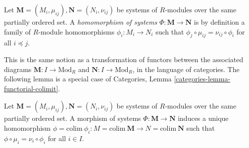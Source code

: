 \begin{definition}
\label{definition-homomorphism-directed-systems}
Let $\textbf{M} = (M_i, \mu_{ij}), \textbf{N} = (N_i, \nu_{ij})$ be
systems of $R$-modules over the same partially ordered set.
A {\it homomorphism of systems} $\Phi : \textbf{M}\rightarrow \textbf{N}$
is by definition a family of $R$-module homomorphisms
$\phi_i : M_i\rightarrow N_{i}$
such that $\phi_j \circ \mu_{ij} = \nu_{ij} \circ \phi_i$
for all $i \preceq j$.
\end{definition}

\noindent
This is the same notion as a transformation of functors
between the associated diagrams $\textbf{M} : I \to \text{Mod}_R$
and $\textbf{N} : I \to \text{Mod}_R$, in the language of
categories.
The following lemma is a special case of
Categories, Lemma \ref{categories-lemma-functorial-colimit}.

\begin{lemma}
\label{lemma-homomorphism-limit}
Let $\textbf{M} = (M_i, \mu_{ij}), \textbf{N} = (N_i, \nu_{ij})$ be
systems of $R$-modules over the same partially ordered set.
A morphism of systems $\Phi : \textbf{M}\rightarrow \textbf{N}$
induces a unique homomorphism
$\phi = \text{colim}\ \phi_{i}: M = \text{colim}\ \textbf{M}
\rightarrow N = \text{colim}\ \textbf{N}$ such that $\phi \circ
\mu_{i} = \nu_{i} \circ \phi_{i}$ for all $i\in I$.
\end{lemma}

